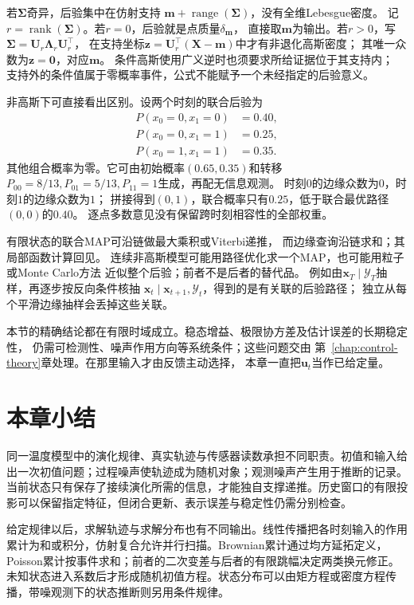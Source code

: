 若$\bm\Sigma$奇异，后验集中在仿射支持
$\bm m+\operatorname{range}(\bm\Sigma)$，没有全维Lebesgue密度。
记$r=\operatorname{rank}(\bm\Sigma)$。若$r=0$，后验就是点质量$\delta_{\bm m}$，
直接取$\bm m$为输出。若$r>0$，写$\bm\Sigma=\bm U_r\bm\Lambda_r\bm U_r^\top$，
在支持坐标$\bm z=\bm U_r^\top(\bm X-\bm m)$中才有非退化高斯密度；
其唯一众数为$\bm z=\bm0$，对应$\bm m$。
条件高斯使用广义逆时也须要求所给证据位于其支持内；
支持外的条件值属于零概率事件，公式不能赋予一个未经指定的后验意义。

非高斯下可直接看出区别。设两个时刻的联合后验为
\[
 \begin{aligned}
  P(x_0=0,x_1=0)&=0.40,\\
  P(x_0=0,x_1=1)&=0.25,\\
  P(x_0=1,x_1=1)&=0.35.
 \end{aligned}
\]
其他组合概率为零。它可由初始概率$(0.65,0.35)$和转移
$P_{00}=8/13,P_{01}=5/13,P_{11}=1$生成，再配无信息观测。
时刻$0$的边缘众数为$0$，时刻$1$的边缘众数为$1$；
拼接得到$(0,1)$，联合概率只有$0.25$，低于联合最优路径$(0,0)$的$0.40$。
逐点多数意见没有保留跨时刻相容性的全部权重。

有限状态的联合MAP可沿链做最大乘积或Viterbi递推，
而边缘查询沿链求和；其局部函数计算回见。
连续非高斯模型可能用路径优化求一个MAP，也可能用粒子或Monte Carlo方法
近似整个后验；前者不是后者的替代品。
例如由$\bm x_T\mid\mathcal Y_T$抽样，再逐步按反向条件核抽
$\bm x_t\mid\bm x_{t+1},\mathcal Y_t$，得到的是有关联的后验路径；
独立从每个平滑边缘抽样会丢掉这些关联。

本节的精确结论都在有限时域成立。稳态增益、极限协方差及估计误差的长期稳定性，
仍需可检测性、噪声作用方向等系统条件；这些问题交由
第~\ref{chap:control-theory}章处理。在那里输入才由反馈主动选择，
本章一直把$\bm u_t$当作已给定量。

\section{本章小结}
\label{sec:dynamical-systems-state-estimation-summary}

同一温度模型中的演化规律、真实轨迹与传感器读数承担不同职责。初值和输入给出一次初值问题；过程噪声使轨迹成为随机对象；观测噪声产生用于推断的记录。当前状态只有保存了接续演化所需的信息，才能独自支撑递推。历史窗口的有限投影可以保留指定特征，但闭合更新、表示误差与稳定性仍需分别检查。

给定规律以后，求解轨迹与求解分布也有不同输出。线性传播把各时刻输入的作用累计为和或积分，仿射复合允许并行扫描。Brownian累计通过均方延拓定义，Poisson累计按事件求和；前者的二次变差与后者的有限跳幅决定两类换元修正。未知状态进入系数后才形成随机初值方程。状态分布可以由矩方程或密度方程传播，带噪观测下的状态推断则另用条件规律。

